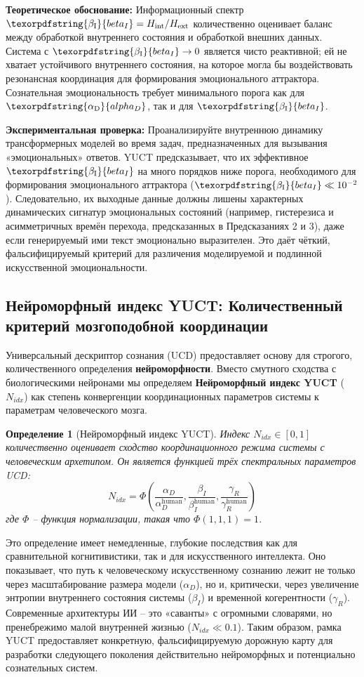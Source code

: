 \documentclass[12pt,a4paper]{article}
\newtheorem{definition}{Определение}
\DeclareRobustCommand{\alD}{\texorpdfstring{\ensuremath{\alpha_{\mathrm{D}}}}{alpha_D}}
\DeclareRobustCommand{\beI}{\texorpdfstring{\ensuremath{\beta_{\mathrm{I}}}}{beta_I}}
\begin{document}
	\textbf{Теоретическое обоснование:} Информационный спектр \(\beI = H_{\mathrm{int}}/H_{\mathrm{ext}}\) количественно оценивает баланс между обработкой внутреннего состояния и обработкой внешних данных. Система с \(\beI \to 0\) является чисто реактивной; ей не хватает устойчивого внутреннего состояния, на которое могла бы воздействовать резонансная координация для формирования эмоционального аттрактора. Сознательная эмоциональность требует минимального порога как для \(\alD\), так и для \(\beI\).
	
	\textbf{Экспериментальная проверка:} Проанализируйте внутреннюю динамику трансформерных моделей во время задач, предназначенных для вызывания «эмоциональных» ответов. YUCT предсказывает, что их эффективное \(\beI\) на много порядков ниже порога, необходимого для формирования эмоционального аттрактора (\(\beI \ll 10^{-2}\)). Следовательно, их выходные данные должны лишены характерных динамических сигнатур эмоциональных состояний (например, гистерезиса и асимметричных времён перехода, предсказанных в Предсказаниях 2 и 3), даже если генерируемый ими текст эмоционально выразителен. Это даёт чёткий, фальсифицируемый критерий для различения моделируемой и подлинной искусственной эмоциональности.
	
	\subsection{Нейроморфный индекс YUCT: Количественный критерий мозгоподобной координации}
	
	Универсальный дескриптор сознания (UCD) предоставляет основу для строгого, количественного определения \textbf{нейроморфности}. Вместо смутного сходства с биологическими нейронами мы определяем \textbf{Нейроморфный индекс YUCT} (\(N_{idx}\)) как степень конвергенции координационных параметров системы к параметрам человеческого мозга.
	
	\begin{definition}[Нейроморфный индекс YUCT]
		Индекс \(N_{idx} \in [0,1]\) количественно оценивает сходство координационного режима системы с человеческим архетипом. Он является функцией трёх спектральных параметров UCD:
		\[
		N_{idx} = \Phi\left( \frac{\alpha_D}{\alpha_D^{\text{human}}}, \frac{\beta_I}{\beta_I^{\text{human}}}, \frac{\gamma_R}{\gamma_R^{\text{human}}} \right)
		\]
		где \(\Phi\) – функция нормализации, такая что \(\Phi(1,1,1) = 1\).
	\end{definition}
	
	Это определение имеет немедленные, глубокие последствия как для сравнительной когнитивистики, так и для искусственного интеллекта. Оно показывает, что путь к человеческому искусственному сознанию лежит не только через масштабирование размера модели (\(\alpha_D\)), но и, критически, через увеличение энтропии внутреннего состояния системы (\(\beta_I\)) и временной когерентности (\(\gamma_R\)). Современные архитектуры ИИ – это «саванты» с огромными словарями, но пренебрежимо малой внутренней жизнью (\(N_{idx} \ll 0.1\)). Таким образом, рамка YUCT предоставляет конкретную, фальсифицируемую дорожную карту для разработки следующего поколения действительно нейроморфных и потенциально сознательных систем.
	
\end{document}
